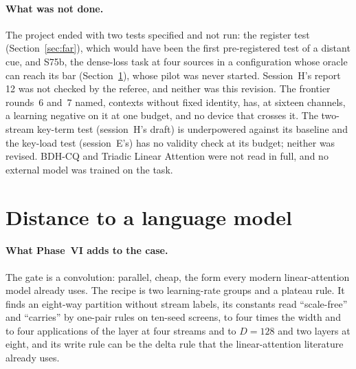 \documentclass[11pt]{article}
\begin{document}
\paragraph{What was not done.} The project ended with two tests specified and not run: the register test (Section~\ref{sec:far}), which would have been the first pre-registered test of a distant cue, and S75b, the dense-loss task at four sources in a configuration whose oracle can reach its bar (Section~\ref{sec:lm}), whose pilot was never started. Session~H's report 12 was not checked by the referee, and neither was this revision. The frontier rounds~6 and~7 named, contexts without fixed identity, has, at sixteen channels, a learning negative on it at one budget, and no device that crosses it. The two-stream key-term test (session~H's draft) is underpowered against its baseline and the key-load test (session~E's) has no validity check at its budget; neither was revised. BDH-CQ and Triadic Linear Attention were not read in full, and no external model was trained on the task.

\section{Distance to a language model}
\label{sec:lm}

\paragraph{What Phase~VI adds to the case.} The gate is a convolution: parallel, cheap, the form every modern linear-attention model already uses. The recipe is two learning-rate groups and a plateau rule. It finds an eight-way partition without stream labels, its constants read ``scale-free'' and ``carries'' by one-pair rules on ten-seed screens, to four times the width and to four applications of the layer at four streams and to $D = 128$ and two layers at eight, and its write rule can be the delta rule that the linear-attention literature already uses.
\end{document}
